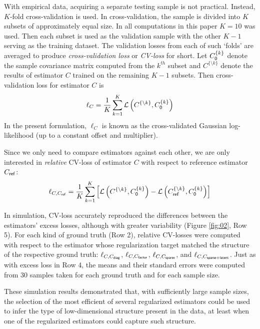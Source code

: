 \documentclass[10pt]{article}
\newcommand{\loss}[1]{\mathcal L\left(#1\right)}
\begin{document}
With empirical data, acquiring a separate testing sample is not practical. Instead, $K$-fold cross-validation is used.  In cross-validation, the sample is divided into $K$ subsets of approximately equal size. In all computations in this paper $K=10$ was used.  Then each  subset is used as the validation sample with the other $K-1$ serving as the training dataset. The validation losses from each of such `folds' are averaged to produce \emph{cross-validation loss} or \emph{CV-loss} for short.  Let $C_{\sf 0}^{\{k\}}$ denote the sample covariance matrix computed from the $k^{th}$ subset and $C^{\{\setminus k\}}$ denote the results of  estimator $C$ trained on the remaining $K-1$ subsets. Then cross-validation loss for estimator $C$ is
\begin{equation}\label{eq:cv-loss}
    \ell_C=\frac 1 K \sum\limits_{k=1}^K \loss{C^{\{\setminus k\}},C_{\sf 0}^{\{k\}}}
\end{equation}
In the present formulation, $\ell_C$ is known as the cross-validated Gaussian log-likelihood (up to a constant offset and multiplier).

Since we only need to compare estimators against each other, we are only interested in \emph{relative} CV-loss of estimator $C$ with respect to reference estimator $C_{\sf ref}$:
\begin{equation}\label{eq:rel-cv-loss}
    \ell_{C,C_{\sf ref}} = \frac 1 K \sum\limits_{k=1}^K \left[
        \loss{C^{\{\setminus k\}},C_{\sf 0}^{\{k\}}} -
    \loss{C_{\sf ref}^{\{\setminus k\}},C_{\sf 0}^{\{k\}}} 
\right]
\end{equation}

In simulation, CV-loss accurately reproduced the differences between the estimators' excess losses, although with greater variability (Figure \ref{fig:02}, Row 5). For each kind of ground truth (Row 2), relative CV-losses were computed with respect to the estimator whose regularization target matched the structure of the respective ground truth: $\ell_{C,C_{\sf diag}}$, $\ell_{C,C_{\sf factor}}$, $\ell_{C,C_{\sf sparse}}$, and $\ell_{C,C_{\sf sparse+latent}}$. Just as with excess loss in Row 4, the means and their standard errors were computed from 30 samples  taken for each ground truth and for each sample size.

These simulation results demonstrated that, with sufficiently large sample sizes, the selection of the most efficient of several regularized estimators could be used to infer the type of low-dimensional structure present in the data, at least when one of the regularized estimators could capture such structure.
\end{document}
